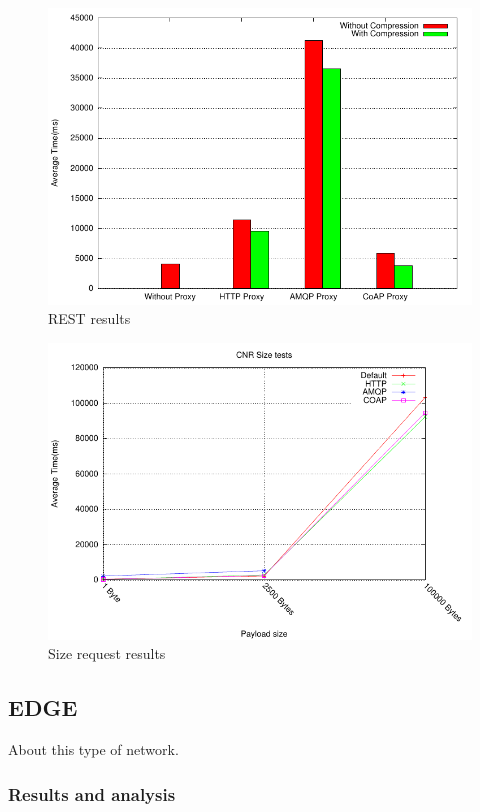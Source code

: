 \begin{figure}[H]
\center
\includegraphics[scale=0.75]{../results/cnr/rest/result.pdf}
\caption{REST results}
\end{figure}

\begin{figure}[H]
\center
\includegraphics[scale=0.75]{../results/cnr/size/result.pdf}
\caption{Size request results}
\end{figure}


\subsection{EDGE}

About this type of network.

\subsubsection{Results and analysis}

